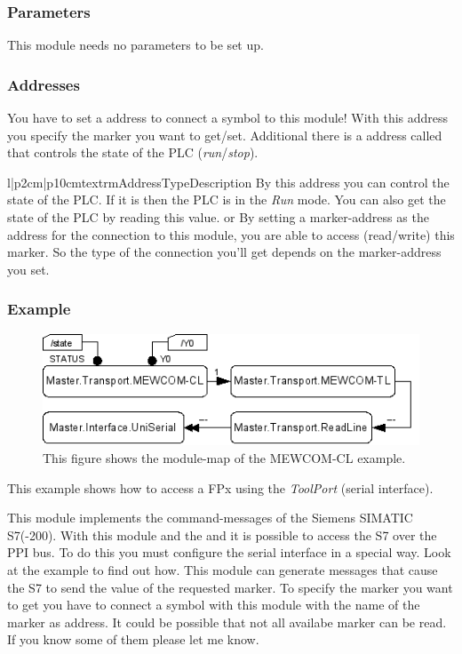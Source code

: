 \subsubsection{Parameters}
This module needs no parameters to be set up.

\subsubsection{Addresses}
You have to set a address to connect a symbol to this module! With this 
address you specify the marker you want to get/set. Additional there is a
address called  that controls the state of the PLC 
(\emph{run}/\emph{stop}).
\begin{tableiii}{l|p{2cm}|p{10cm}}{textrm}{Address}{Type}{Description}
        {}
        {By this address you can control the state of the PLC. If it is 
          then the PLC is in the \emph{Run} mode. You can also
         get the state of the PLC by reading this value.}
        { or
         }
        {By setting a marker-address as the address for the connection to this 
         module, you are able to access (read/write) this marker. So the type 
         of the connection you'll get depends on the marker-address you set.} 
\end{tableiii}

\subsubsection{Example}
\begin{figure}[ht]
    \label{fig:coremod11}
    \centering
    \includegraphics{coremod11.png}
    \caption{This figure shows the module-map of the MEWCOM-CL example.}
\end{figure}    
This example shows how to access a FPx using the \emph{ToolPort} (serial interface).





%
%
%
This module implements the command-messages of the Siemens SIMATIC S7(-200). 
With this module and the  and 
 it is possible to access the S7 over the 
PPI bus. To do this you must configure the serial interface in a special way. 
Look at the example to find out how. This module can generate messages that 
cause the S7 to send the value of the requested marker. To specify the marker 
you want to get you have to connect a symbol with this module with the name of
the marker as address. It could be possible that not all availabe marker can be
read. If you know some of them please let me know.

